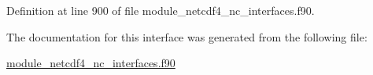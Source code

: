 Definition at line 900 of file module\+\_\+netcdf4\+\_\+nc\+\_\+interfaces.\+f90.



The documentation for this interface was generated from the following file\+:\begin{DoxyCompactItemize}
\item 
\hyperlink{module__netcdf4__nc__interfaces_8f90}{module\+\_\+netcdf4\+\_\+nc\+\_\+interfaces.\+f90}\end{DoxyCompactItemize}
